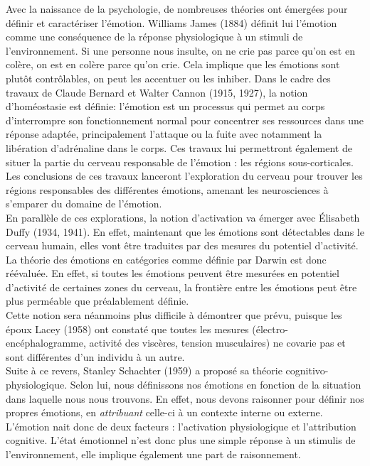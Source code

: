 Avec la naissance de la psychologie, de nombreuses théories ont émergées pour définir et caractériser l'émotion. Williams James (1884) définit lui l'émotion comme une conséquence de la réponse physiologique à un stimuli de l'environnement. Si une personne nous insulte, on ne crie pas parce qu'on est en colère, on est en colère parce qu'on crie. Cela implique que les émotions sont plutôt contrôlables, on peut les accentuer ou les inhiber.
Dans le cadre des travaux de Claude Bernard et Walter Cannon (1915, 1927), la notion d’homéostasie est définie: l'émotion est un processus qui permet au corps d'interrompre son fonctionnement normal pour concentrer ses ressources dans une réponse adaptée, principalement l'attaque ou la fuite avec notamment la libération d'adrénaline dans le corps. Ces travaux lui permettront également de situer la partie du cerveau responsable de l'émotion : les régions sous-corticales.
Les conclusions de ces travaux lanceront l'exploration du cerveau pour trouver les régions responsables des différentes émotions, amenant les neurosciences à s'emparer du domaine de l'émotion. \\
En parallèle de ces explorations, la notion d'activation va émerger avec Élisabeth Duffy (1934, 1941). En effet, maintenant que les émotions sont détectables dans le cerveau humain, elles vont être traduites par des mesures du potentiel d'activité. La théorie des émotions en catégories comme définie par Darwin est donc réévaluée. En effet, si toutes les émotions peuvent être mesurées en potentiel d'activité de certaines zones du cerveau, la frontière entre les émotions peut être plus perméable que préalablement définie. \\
Cette notion sera néanmoins plus difficile à démontrer que prévu, puisque les époux Lacey (1958) ont constaté que toutes les mesures (électro-encéphalogramme, activité des viscères, tension musculaires) ne covarie pas et sont différentes d'un individu à un autre. \\
Suite à ce revers, Stanley Schachter (1959) a proposé sa théorie cognitivo-physiologique. Selon lui, nous définissons nos émotions en fonction de la situation dans laquelle nous nous trouvons. En effet, nous devons raisonner pour définir nos propres émotions, en \textit{attribuant} celle-ci à un contexte interne ou externe. L'émotion nait donc de deux facteurs : l'activation physiologique et l'attribution cognitive. L'état émotionnel n'est donc plus une simple réponse à un stimulis de l'environnement, elle implique également une part de raisonnement. \\
